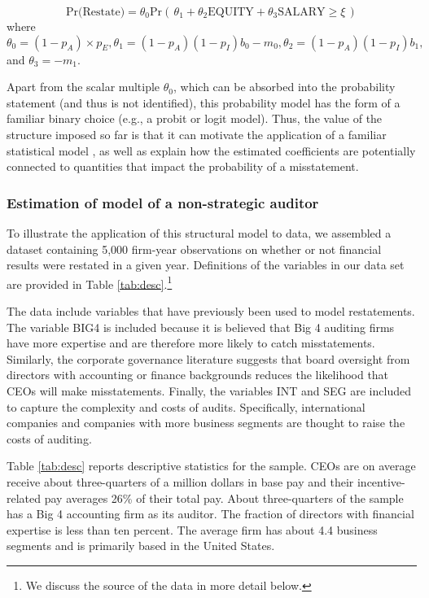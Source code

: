 \begin{equation} \label{restate1}
\mbox{Pr(Restate)} = \theta_0 \mbox{Pr}\left(\, \theta_1 + \theta_2 \mbox{EQUITY} + \theta_3 \mbox{SALARY}  \ge \xi \,\right)
\end{equation}
where $\theta_0=(1-p_A) \times p_{E}, \theta_1 = (1 - p_A)(1 - p_I) b_0 - m_0, 
\theta_2 = (1 - p_A)(1 - p_I) b_1,$ and $\theta_3 = - m_1$. 

Apart from the scalar multiple $\theta_0$, which can be absorbed into the probability statement (and thus is not identified), this probability model has the form of  a familiar binary choice (e.g., a probit or logit model).
Thus, the value of the structure imposed so far is that it can motivate the application of a familiar statistical model \citep[as in]{Efendi:2007ja}, as well as explain how the estimated coefficients are potentially connected to quantities that impact the probability of a misstatement.

\subsubsection{Estimation of model of a non-strategic auditor}
To illustrate the application of this structural model to data, we assembled a dataset containing 5,000 firm-year observations on whether or not financial results were restated in a given year.
Definitions of the variables in our data set are provided in Table \ref{tab:desc}.\footnote{
We discuss the source of the data in more detail below.}

The data include variables that have previously been used to model restatements.
The variable BIG4 is included because it is believed that Big 4 auditing firms have more expertise and are therefore more likely to catch misstatements. 
Similarly, the corporate governance literature suggests that board oversight from directors with accounting or finance backgrounds reduces the likelihood that CEOs will make misstatements. 
Finally, the variables INT and SEG are included to capture the complexity and costs of audits. 
Specifically, international companies and companies with more business segments are thought to raise the costs of auditing. 

Table \ref{tab:desc} reports descriptive statistics for the sample. 
CEOs are on average receive about three-quarters of a million dollars in base pay and their incentive-related pay averages 26\% of their total pay.
About three-quarters of the sample has a Big 4 accounting firm as its auditor. 
The fraction of directors with financial expertise is less than ten percent. 
The average firm has about 4.4 business segments and is primarily based in the United States.

